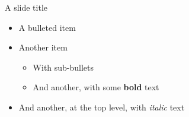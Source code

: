 \begin{frame}{A slide title}

  \begin{itemize}
    \item A bulleted item
    \item Another item
      \begin{itemize}
        \item With sub-bullets
        \item And another, with some \textbf{bold} text
      \end{itemize}
    \item And another, at the top level, with \textit{italic} text
  \end{itemize}


\end{frame}
